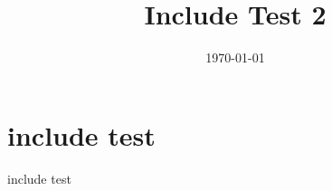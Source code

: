 \documentclass[12pt, english, a4paper]{article}
\begin{document}
\title{Include Test 2}
\date{\today}
\maketitle

\section{include test}

include test


\end{document}
